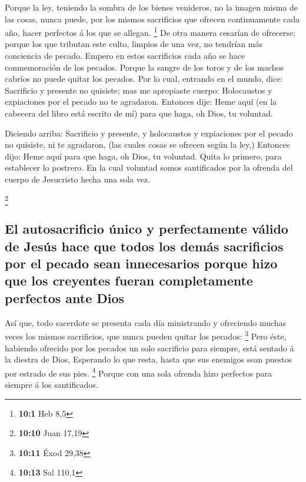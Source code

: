  Porque la ley, teniendo la sombra de los bienes
venideros, no la imagen misma de las cosas, nunca puede, por los mismos
sacrificios que ofrecen continuamente cada año, hacer perfectos á los
que se allegan. \footnote{\textbf{10:1} Heb 8,5}  De otra
manera cesarían de ofrecerse; porque los que tributan este culto,
limpios de una vez, no tendrían más conciencia de pecado. 
Empero en estos sacrificios cada año se hace conmemoración de los
pecados.  Porque la sangre de los toros y de los machos
cabríos no puede quitar los pecados.  Por lo cual,
entrando en el mundo, dice: Sacrificio y presente no quisiste; mas me
apropiaste cuerpo:  Holocaustos y expiaciones por el
pecado no te agradaron.  Entonces dije: Heme aquí (en la
cabecera del libro está escrito de mí) para que haga, oh Dios, tu
voluntad.

 Diciendo arriba: Sacrificio y presente, y holocaustos y
expiaciones por el pecado no quisiste, ni te agradaron, (las cuales
cosas se ofrecen según la ley,)  Entonces dijo: Heme aquí
para que haga, oh Dios, tu voluntad. Quita lo primero, para establecer
lo postrero.  En la cual voluntad somos santificados por
la ofrenda del cuerpo de Jesucristo hecha una sola vez.

\footnote{\textbf{10:10} Juan 17,19}

\hypertarget{el-autosacrificio-uxfanico-y-perfectamente-vuxe1lido-de-jesuxfas-hace-que-todos-los-demuxe1s-sacrificios-por-el-pecado-sean-innecesarios-porque-hizo-que-los-creyentes-fueran-completamente-perfectos-ante-dios}{%
\subsection{El autosacrificio único y perfectamente válido de Jesús hace
que todos los demás sacrificios por el pecado sean innecesarios porque
hizo que los creyentes fueran completamente perfectos ante
Dios}\label{el-autosacrificio-uxfanico-y-perfectamente-vuxe1lido-de-jesuxfas-hace-que-todos-los-demuxe1s-sacrificios-por-el-pecado-sean-innecesarios-porque-hizo-que-los-creyentes-fueran-completamente-perfectos-ante-dios}}

 Así que, todo sacerdote se presenta cada día ministrando
y ofreciendo muchas veces los mismos sacrificios, que nunca pueden
quitar los pecados: \footnote{\textbf{10:11} Éxod 29,38} 
Pero éste, habiendo ofrecido por los pecados un solo sacrificio para
siempre, está sentado á la diestra de Dios,  Esperando lo
que resta, hasta que sus enemigos sean puestos por estrado de sus pies.
\footnote{\textbf{10:13} Sal 110,1}  Porque con una sola
ofrenda hizo perfectos para siempre á los santificados.

